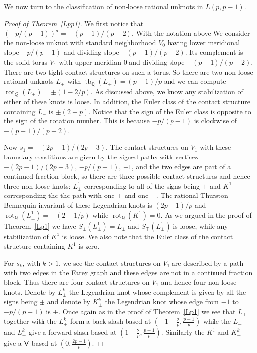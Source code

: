 \documentclass[11pt]{amsart}
\theoremstyle{plain}
\theoremstyle{definition}
\theoremstyle{remark}
\numberwithin{theorem}{section}
\newcommand{\Q}{\mathbb{Q}}           %
\DeclareMathOperator\tb{tb}                   %
\DeclareMathOperator\rot{rot}                 %
\begin{document}
We now turn to the classification of non-loose rational unknots in $L(p,p-1)$. 
\begin{proof}[Proof of Theorem~\ref{Lpp1}]
We first notice that $(-p/(p-1))^a=-(p-1)/(p-2)$. With the notation above We consider the non-loose unknot with standard neighborhood $V_0$ having lower meridional slope $-p/(p-1)$ and dividing slope $-(p-1)/(p-2)$. Its complement is the solid torus $V_1$ with upper meridian $0$ and dividing slope $-(p-1)/(p-2)$. There are two tight contact structures on such a torus. So there are two non-loose rational unknots $L_\pm$ with $\tb_\Q(L_\pm)=(p-1)/p$ and we can compute $\rot_Q(L_\pm)=\pm(1-2/p)$. As discussed above, we know any stabilization of either of these knots is loose. In addition, the Euler class of the contact structure containing $L_\pm$ is $\pm(2-p)$. Notice that the sign of the Euler class is opposite to the sign of the rotation number. This is because $-p/(p-1)$ is clockwise of $-(p-1)/(p-2)$. 

Now $s_1=-(2p-1)/(2p-3)$. The contact structures on $V_1$ with these boundary conditions are given by the signed paths with vertices $-(2p-1)/(2p-3)$, $-p/(p-1)$, $-1$, and  the two edges are part of a continued fraction block, so there are three possible contact structures and hence three non-loose knots: $L_\pm^1$ corresponding to all of the signs being $\pm$ and $K^1$ corresponding the the path with one $+$ and one $-$. The rational Thurston-Bennequin invariant of these Legendrian knots is $(2p-1)/p$ and $\rot_\Q(L^1_\pm)= \pm (2-1/p)$ while $\rot_\Q(K^1)=0$. As we argued in the proof of Theorem~\ref{Lp1} we have $S_\pm(L^1_\pm)=L_\pm$ and $S_\mp(L^1_\pm)$ is loose, while any stabilization of $K^1$ is loose. We also note that the Euler class of the contact structure containing $K^1$ is zero. 

For $s_k$, with $k>1$, we see the contact structures on $V_1$ are described by a path with two edges in the Farey graph and these edges are not in a continued fraction block. Thus there are four contact structures on $V_1$ and hence four non-loose knots. Denote by $L_\pm^k$ the Legendrian knot whose complement is given by all the signs being $\pm$ and denote by $K_\pm^k$ the Legendrian knot whose edge from $-1$ to $-p/(p-1)$ is $\pm$. Once again as in the proof of Theorem~\ref{Lp1} we see that $L_+$ together with the $L_+^k$ form a back slash based at $(-1+\frac 2p, \frac{p-1}p)$ while the $L_-$ and $L^k_-$ give a forward slash based at $(1-\frac 2p, \frac{p-1}p)$. Similarly the $K^1$ and $K^k_\pm$ give a $\normalfont\textsf{V}$ based at $(0, \frac{2p-1}p)$.
\end{proof}
\end{document}
